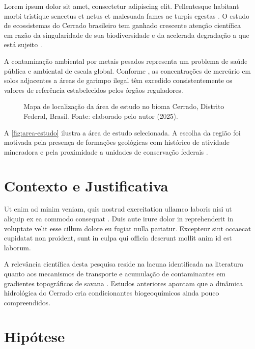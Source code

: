 
Lorem ipsum dolor sit amet, consectetur adipiscing elit. Pellentesque
habitant morbi tristique senectus et netus et malesuada fames ac turpis
egestas \cite{exemplo:artigo:2024}. O estudo de ecossistemas do Cerrado
brasileiro tem ganhado crescente atenção científica em razão da
singularidade de sua biodiversidade e da acelerada degradação a que está
sujeito \cite{exemplo:livro:2020}.

A contaminação ambiental por metais pesados representa um problema de
saúde pública e ambiental de escala global. Conforme
, as concentrações de mercúrio em solos
adjacentes a áreas de garimpo ilegal têm excedido consistentemente os
valores de referência estabelecidos pelos órgãos reguladores.

\begin{figure}[H]
  \centering
  \fbox{\rule{0pt}{5cm}\rule{10cm}{0pt}}
  \caption{Mapa de localização da área de estudo no bioma Cerrado,
           Distrito Federal, Brasil. Fonte: elaborado pelo autor (2025).}
  \label{fig:area-estudo}
\end{figure}

A \autoref{fig:area-estudo} ilustra a área de estudo selecionada.
A escolha da região foi motivada pela presença de formações geológicas
com histórico de atividade mineradora e pela proximidade a unidades
de conservação federais \cite{exemplo:web:2024}.

\section{Contexto e Justificativa}

Ut enim ad minim veniam, quis nostrud exercitation ullamco laboris nisi
ut aliquip ex ea commodo consequat \cite{exemplo:artigo:2024}. Duis aute
irure dolor in reprehenderit in voluptate velit esse cillum dolore eu
fugiat nulla pariatur. Excepteur sint occaecat cupidatat non proident,
sunt in culpa qui officia deserunt mollit anim id est laborum.

A relevância científica desta pesquisa reside na lacuna identificada na
literatura quanto aos mecanismos de transporte e acumulação de
contaminantes em gradientes topográficos de savana
\cite{exemplo:capitulo:2019}. Estudos anteriores \cite{exemplo:anais:2023}
apontam que a dinâmica hidrológica do Cerrado cria condicionantes
biogeoquímicos ainda pouco compreendidos.

\section{Hipótese}

